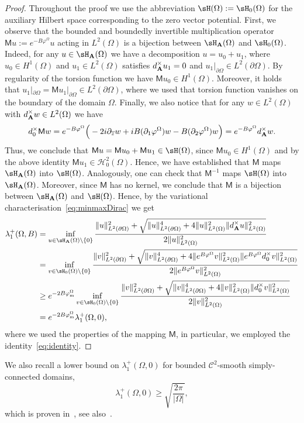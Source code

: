 \documentclass[11pt,a4paper]{amsart}
\newcommand\Omg{\Omega}
\newcommand\sm{\setminus}
\def\p{\partial}
\def\lm{\lambda}
\def\p{\partial}
\numberwithin{figure}{section}
\numberwithin{equation}{section}
\theoremstyle{plain}%
\theoremstyle{remark}
\theoremstyle{plain}
\newcommand\ov{\overline}
\def\ov{\overline}
\def\sfM{{\mathsf M}}   \def\sfN{{\mathsf N}}   \def\sfO{{\mathsf O}}
\begin{document}
\begin{proof}
	Throughout the proof we use the abbreviation $\sH(\Omg) := \sH_0(\Omg)$ for the auxiliary Hilbert space corresponding to the zero vector potential.	First, we observe that the
	bounded and boundedly invertible multiplication operator 
	$\sfM u := e^{-B\varphi^\Omg} u$ acting in $L^2(\Omg)$ is a bijection between $\sH_{\bf A}(\Omg)$ and $\sH_0(\Omg)$. Indeed, for any $u\in\sH_{\bf A}(\Omg)$ we have a decomposition $u = u_0 + u_1$, where $u_0\in H^1(\Omg)$ and $u_1\in L^2(\Omg)$ satisfies $d_{\bf A}^\times u_1 = 0$ and $u_1|_{\p\Omg}\in L^2(\p\Omg)$. By regularity of the torsion function we have $\sfM u_0 \in H^1(\Omg)$.
	Moreover, it holds that $u_1|_{\p\Omg} = \sfM u_1|_{\p\Omg}\in L^2(\p\Omg)$, where we used that torsion function vanishes on the boundary of the domain $\Omg$. Finally, we also notice
	that for any $w\in L^2(\Omg)$ with $d_{\bf A}^\times w\in L^2(\Omg)$ we have
	\begin{equation}\label{eq:identity}
		d_0^\times \sfM w = e^{-B\varphi^\Omg}\Big(-2i \p_{\ov z} w + i B(\p_1\varphi^\Omg) w  - B(\p_2\varphi^\Omg) w\Big) = e^{-B\varphi^\Omg} d_{\bf A}^\times w. 
	\end{equation}
	Thus, we conclude that $\sfM u =\sfM u_0 + \sfM u_1\in\sH(\Omg)$, since $\sfM u_0\in H^1(\Omg)$ and
	by the above identity $\sfM u_1\in\mathscr{H}_{0}^2(\Omg)$. Hence, we have established that $\sfM$ maps $\sH_{{\bf A}}(\Omg)$ into $\sH(\Omg)$. Analogously, one can check that $\sfM^{-1}$ maps $\sH(\Omg)$ into $\sH_{{\bf A}}(\Omg)$. Moreover, since $\sfM$ has no kernel, we conclude that $\sfM$ is a bijection between $\sH_{\bf A}(\Omg)$ and $\sH(\Omg)$.
	Hence, by the variational characterisation~\eqref{eq:minmaxDirac} we get
	\[
	\begin{aligned}
		\lm_1^+(\Omg,B) &= \inf_{u\in \sH_{{\bf A}}(\Omg)\sm\{0\}}
		\frac{\|u\|^2_{L^2(\p\Omg)} + \sqrt{\|u\|^4_{L^2(\p\Omg)}+ 4\|u\|^2_{L^2(\Omg)} \|d_{\bf A}^\times u\|^2_{L^2(\Omg)}}}{2\|u\|^2_{L^2(\Omg)}}\\
		&=\inf_{v\in \sH_0(\Omg)\sm\{0\}}
		\frac{\|v\|^2_{L^2(\p\Omg)} + \sqrt{\|v\|^4_{L^2(\p\Omg)}+ 4\|e^{B\varphi^\Omg}v\|^2_{L^2(\Omg)} \|e^{B\varphi^\Omg}d_0^\times v\|^2_{L^2(\Omg)}}}{2\|e^{B\varphi^\Omg} v\|^2_{L^2(\Omg)}}\\
		&\ge e^{-2B\varphi^\Omg_{\rm m}}\inf_{v\in \sH_0(\Omg)\sm\{0\}}
				\frac{\|v\|^2_{L^2(\p\Omg)} + \sqrt{\|v\|^4_{L^2(\p\Omg)}+ 4\|v\|^2_{L^2(\Omg)} \|d_0^\times v\|^2_{L^2(\Omg)}}}{2\|v\|^2_{L^2(\Omg)}}\\
				& = e^{-2B\varphi^\Omg_{\rm m}}\lm_1^+(\Omg,0),
		\end{aligned}
	\]
	where we used the properties of the mapping $\sfM$, in particular, we employed the identity~\eqref{eq:identity}.
\end{proof}
We also recall a lower bound on $\lm_1^+(\Omg,0)$ for bounded $\mathscr C^2$-smooth simply-connected domains,
\begin{equation}\label{eq:lbnd}
	\lm_1^+(\Omg,0) \ge \sqrt{ \frac{2\pi}{|\Omg|}},
\end{equation}
which is proven in~\cite[Theorem 1]{BFSV17b}, see also~\cite[Theorem 1]{R06}.
\medskip
\end{document}
